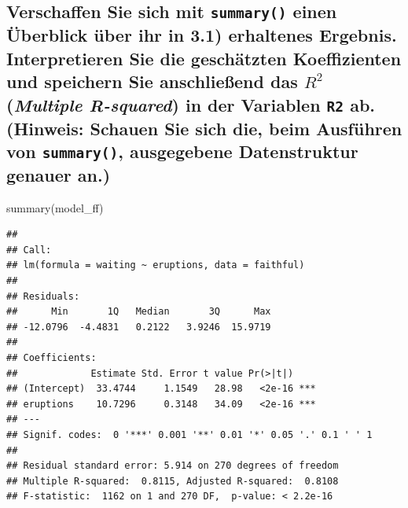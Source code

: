 \documentclass[12pt,a4paper]{article}
\newenvironment{Shaded}{\begin{snugshade}}{\end{snugshade}}
\newcommand{\FunctionTok}[1]{\textcolor[rgb]{0.00,0.00,0.00}{#1}}
\newcommand{\NormalTok}[1]{#1}
\begin{document}
\hypertarget{verschaffen-sie-sich-mit-summary-einen-uxfcberblick-uxfcber-ihr-in-3.1-erhaltenes-ergebnis.-interpretieren-sie-die-geschuxe4tzten-koeffizienten-und-speichern-sie-anschlieuxdfend-das-r2-multiple-r-squared-in-der-variablen-r2-ab.-hinweis-schauen-sie-sich-die-beim-ausfuxfchren-von-summary-ausgegebene-datenstruktur-genauer-an.}{%
\subsection{\texorpdfstring{Verschaffen Sie sich mit \texttt{summary()}
einen Überblick über ihr in 3.1) erhaltenes Ergebnis. Interpretieren Sie
die geschätzten Koeffizienten und speichern Sie anschließend das \(R^2\)
(\emph{Multiple R-squared}) in der Variablen \texttt{R2} ab. (Hinweis:
Schauen Sie sich die, beim Ausführen von \texttt{summary()}, ausgegebene
Datenstruktur genauer
an.)}{Verschaffen Sie sich mit summary() einen Überblick über ihr in 3.1) erhaltenes Ergebnis. Interpretieren Sie die geschätzten Koeffizienten und speichern Sie anschließend das R\^{}2 (Multiple R-squared) in der Variablen R2 ab. (Hinweis: Schauen Sie sich die, beim Ausführen von summary(), ausgegebene Datenstruktur genauer an.)}}\label{verschaffen-sie-sich-mit-summary-einen-uxfcberblick-uxfcber-ihr-in-3.1-erhaltenes-ergebnis.-interpretieren-sie-die-geschuxe4tzten-koeffizienten-und-speichern-sie-anschlieuxdfend-das-r2-multiple-r-squared-in-der-variablen-r2-ab.-hinweis-schauen-sie-sich-die-beim-ausfuxfchren-von-summary-ausgegebene-datenstruktur-genauer-an.}}

\begin{Shaded}
\begin{Highlighting}[]
    \FunctionTok{summary}\NormalTok{(model\_ff)}
\end{Highlighting}
\end{Shaded}

\begin{verbatim}
## 
## Call:
## lm(formula = waiting ~ eruptions, data = faithful)
## 
## Residuals:
##      Min       1Q   Median       3Q      Max 
## -12.0796  -4.4831   0.2122   3.9246  15.9719 
## 
## Coefficients:
##             Estimate Std. Error t value Pr(>|t|)    
## (Intercept)  33.4744     1.1549   28.98   <2e-16 ***
## eruptions    10.7296     0.3148   34.09   <2e-16 ***
## ---
## Signif. codes:  0 '***' 0.001 '**' 0.01 '*' 0.05 '.' 0.1 ' ' 1
## 
## Residual standard error: 5.914 on 270 degrees of freedom
## Multiple R-squared:  0.8115, Adjusted R-squared:  0.8108 
## F-statistic:  1162 on 1 and 270 DF,  p-value: < 2.2e-16
\end{verbatim}
\end{document}
